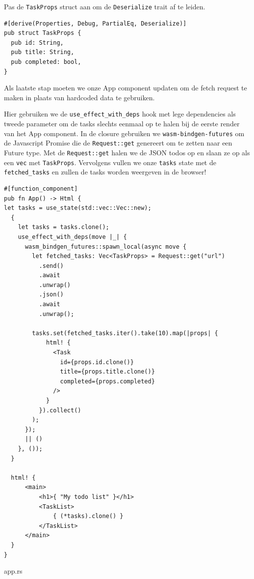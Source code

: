 Pas de \texttt{TaskProps} struct aan om de \texttt{Deserialize} trait af te leiden.

\begin{verbatim}
#[derive(Properties, Debug, PartialEq, Deserialize)]
pub struct TaskProps {
  pub id: String,
  pub title: String,
  pub completed: bool,
}
\end{verbatim}

Als laatste stap moeten we onze App component updaten om de fetch request te maken in plaats van
hardcoded data te gebruiken.

Hier gebruiken we de \texttt{use_effect_with_deps} hook met lege dependencies als tweede
parameter om de tasks slechts eenmaal op te halen bij de eerste render van het App component. In de
closure gebruiken we \texttt{wasm-bindgen-futures} om de Javascript Promise die de
\texttt{Request::get} genereert om te zetten naar een Future type. Met de
\texttt{Request::get} halen we de JSON todos op en slaan ze op als een
\texttt{vec} met \texttt{TaskProps}. Vervolgens vullen we onze
\texttt{tasks} state met de \texttt{fetched_tasks} en zullen de tasks worden
weergeven in de browser!

\begin{listing}
\begin{verbatim}
#[function_component]
pub fn App() -> Html {
let tasks = use_state(std::vec::Vec::new);
  {
    let tasks = tasks.clone();
    use_effect_with_deps(move |_| {
      wasm_bindgen_futures::spawn_local(async move {
        let fetched_tasks: Vec<TaskProps> = Request::get("url")
          .send()
          .await
          .unwrap()
          .json()
          .await
          .unwrap();

        tasks.set(fetched_tasks.iter().take(10).map(|props| {
            html! { 
              <Task 
                id={props.id.clone()} 
                title={props.title.clone()} 
                completed={props.completed} 
              /> 
            }
          }).collect()
        );
      });
      || ()
    }, ());
  }

  html! {
      <main>
          <h1>{ "My todo list" }</h1>
          <TaskList>
              { (*tasks).clone() }
          </TaskList>
      </main>
  }
}
\end{verbatim}
\caption{app.rs}
\end{listing}

\clearpage

